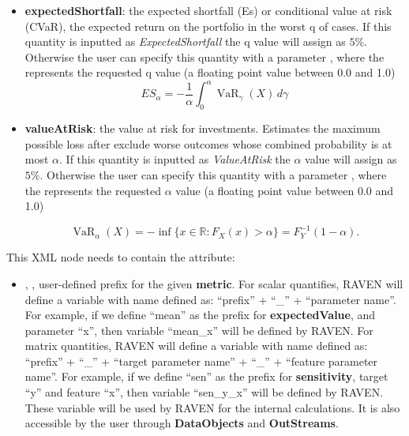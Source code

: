 \begin{itemize}
\begin{itemize}
  
  \item \textbf{expectedShortfall}: the expected shortfall (Es) or conditional value at risk (CVaR), the expected return on the portfolio in the worst q of cases. If this quantity is inputted as \textit{ExpectedShortfall} the q value will assign as $5\%$. Otherwise the user can specify this quantity with a parameter , where the  represents the requested q value (a floating point value between 0.0 and 1.0)
  \begin{equation}
    ES_\alpha = -\frac{1}{\alpha} \int_0^\alpha \operatorname{VaR}_\gamma(X) \, d\gamma
  \end{equation}
  \item \textbf{valueAtRisk}: the value at risk for investments. Estimates the maximum possible loss after exclude worse outcomes whose combined probability is at most $\alpha$. If this quantity is inputted as \textit{ValueAtRisk} the $\alpha$ value will assign as $5\%$. Otherwise the user can specify this quantity with a parameter , where the  represents the requested $\alpha$ value (a floating point value between 0.0 and 1.0)
  
  \begin{equation}
    \operatorname{VaR}_\alpha(X)=-\inf\big\{x\in\mathbb{R}:F_X(x)>\alpha\big\} = F^{-1}_Y(1-\alpha).
  \end{equation}
  \end{itemize}
  This XML node needs to contain the attribute:
  \begin{itemize}
    \itemsep0em
    \item {}, , user-defined prefix for the given \textbf{metric}.
      For scalar quantifies, RAVEN will define a variable with name defined as:  ``prefix'' + ``\_'' + ``parameter name''.
      For example, if we define ``mean'' as the prefix for \textbf{expectedValue}, and parameter ``x'', then variable
      ``mean\_x'' will be defined by RAVEN.
      For matrix quantities, RAVEN will define a variable with name defined as: ``prefix'' + ``\_'' + ``target parameter name'' + ``\_'' + ``feature parameter name''.
      For example, if we define ``sen'' as the prefix for \textbf{sensitivity}, target ``y'' and feature ``x'', then
      variable ``sen\_y\_x'' will be defined by RAVEN.
      \nb These variable will be used by RAVEN for the internal calculations. It is also accessible by the user through
      \textbf{DataObjects} and \textbf{OutStreams}.
  \end{itemize}

\end{itemize}


